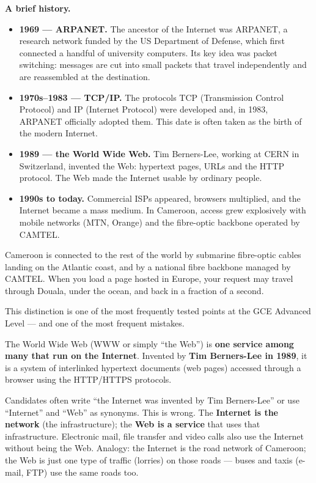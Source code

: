 \documentclass[11pt]{article}
\newcommand{\cle}[1]{{\popxbold\color{popdark}#1}}
\newcounter{popsec}
\newcounter{popsub}
\newcommand{\courssub}[1]{%
  \stepcounter{popsub}%
  \par\vspace{9pt}\noindent{\popxbold\fontsize{11.5}{13}\selectfont\color{popink}{\color{poporange}\thepopsec.\thepopsub}\hspace{6pt}#1}\par\nopagebreak\vspace{4pt}
}
\begin{document}
\textbf{A brief history.}
\begin{itemize}
\item \textbf{1969 — ARPANET.} The ancestor of the Internet was ARPANET, a research network funded by the US Department of Defense, which first connected a handful of university computers. Its key idea was \cle{packet switching}: messages are cut into small packets that travel independently and are reassembled at the destination.
\item \textbf{1970s–1983 — TCP/IP.} The protocols TCP (Transmission Control Protocol) and IP (Internet Protocol) were developed and, in 1983, ARPANET officially adopted them. This date is often taken as the birth of the modern Internet.
\item \textbf{1989 — the World Wide Web.} Tim Berners-Lee, working at CERN in Switzerland, invented the Web: hypertext pages, URLs and the HTTP protocol. The Web made the Internet usable by ordinary people.
\item \textbf{1990s to today.} Commercial ISPs appeared, browsers multiplied, and the Internet became a mass medium. In Cameroon, access grew explosively with mobile networks (MTN, Orange) and the fibre-optic backbone operated by CAMTEL.
\end{itemize}

\begin{savaistu}
Cameroon is connected to the rest of the world by submarine fibre-optic cables landing on the Atlantic coast, and by a national fibre backbone managed by CAMTEL. When you load a page hosted in Europe, your request may travel through Douala, under the ocean, and back in a fraction of a second.
\end{savaistu}

\courssub{The Internet versus the World Wide Web}

This distinction is one of the most frequently tested points at the GCE Advanced Level — and one of the most frequent mistakes.

\begin{definition}
The \cle{World Wide Web} (WWW or simply ``the Web'') is \textbf{one service among many that run on the Internet}. Invented by \textbf{Tim Berners-Lee in 1989}, it is a system of interlinked hypertext documents (web pages) accessed through a browser using the HTTP/HTTPS protocols.
\end{definition}

\begin{attention}
Candidates often write ``the Internet was invented by Tim Berners-Lee'' or use ``Internet'' and ``Web'' as synonyms. This is wrong. The \textbf{Internet is the network} (the infrastructure); the \textbf{Web is a service} that uses that infrastructure. Electronic mail, file transfer and video calls also use the Internet without being the Web. Analogy: the Internet is the road network of Cameroon; the Web is just one type of traffic (lorries) on those roads — buses and taxis (e-mail, FTP) use the same roads too.
\end{attention}
\end{document}
